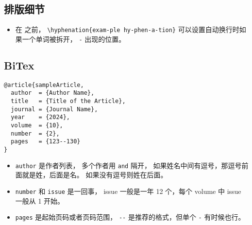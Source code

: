 
\begin{issues}
\issueDraft
\end{issues}

\subsection{排版细节}
\begin{itemize}
\item 在 \verb`` 之前， \verb`\hyphenation{exam-ple hy-phen-a-tion}` 可以设置自动换行时如果一个单词被拆开， \verb`-` 出现的位置。
\end{itemize}

\subsection{BiTex}

\begin{lstlisting}[language=none, caption=BibTeX 的例子]
@article{sampleArticle,
  author  = {Author Name},
  title   = {Title of the Article},
  journal = {Journal Name},
  year    = {2024},
  volume  = {10},
  number  = {2},
  pages   = {123--130}
}
\end{lstlisting}

\begin{itemize}
\item \verb`author` 是作者列表， 多个作者用 \verb`and` 隔开， 如果姓名中间有逗号，那逗号前面就是姓，后面是名。 如果没有逗号则姓在后面。
\item \verb`number` 和 \verb`issue` 是一回事， issue 一般是一年 12 个，每个 volume 中 issue 一般从 1 开始。
\item \verb`pages` 是起始页码或者页码范围， \verb`--` 是推荐的格式，但单个 \verb`-` 有时候也行。
\end{itemize}
